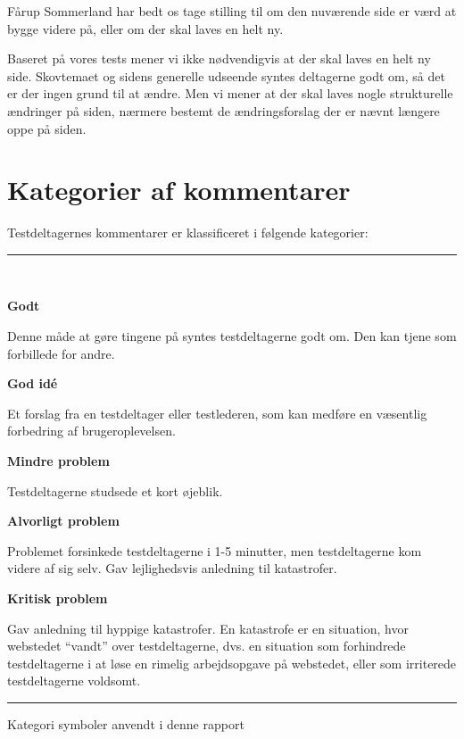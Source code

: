 \documentclass[10pt,a4paper]{article}      %
\newcommand\pic[1]{\texttt{[image: Pics/\#1]}}
\renewcommand\good{\pic{good}}
\renewcommand\goodidea{\pic{goodidea}}
\renewcommand\smallproblem{\pic{smallproblem}}
\renewcommand\seriousproblem{\pic{seriousproblem}}
\renewcommand\criticalproblem{\pic{criticalproblem}}
\begin{document}
\noindent Fårup Sommerland har bedt os tage stilling til om den nuværende side er værd at bygge videre på, eller om der skal laves en helt ny.

Baseret på vores tests mener vi ikke nødvendigvis at der skal laves en helt ny side. Skovtemaet og sidens generelle udseende syntes deltagerne godt om, så det er der ingen grund til at ændre. Men vi mener at der skal laves nogle strukturelle ændringer på siden, nærmere bestemt de ændringsforslag der er nævnt længere oppe på siden.

\clearpage

\tableofcontents
\clearpage


\section{Kategorier af kommentarer}
Testdeltagernes kommentarer er klassificeret i følgende kategorier:


\begin{table}[!ht]
\centering
\rule{\linewidth}{\heavyrulewidth}\\[6mm]
\begin{kommentarer}

\item[\good] \textbf{Godt}

Denne måde at gøre tingene på syntes testdeltagerne godt om. Den kan tjene som
forbillede for andre.

\item[\goodidea] \textbf{God idé}

Et forslag fra en testdeltager eller testlederen, som kan medføre en væsentlig
forbedring af brugeroplevelsen.

\item[\smallproblem] \textbf{Mindre problem}

Testdeltagerne studsede et kort øjeblik.

\item[\seriousproblem] \textbf{Alvorligt problem}

Problemet forsinkede testdeltagerne i 1-5 minutter, men testdeltagerne kom
videre af sig selv.  Gav lejlighedsvis anledning til katastrofer.

\item[\criticalproblem] \textbf{Kritisk problem}

Gav anledning til hyppige katastrofer. En katastrofe er en situation, hvor
webstedet ``vandt'' over testdeltagerne, dvs. en situation som forhindrede
testdeltagerne i at løse en rimelig arbejdsopgave på webstedet, eller som
irriterede testdeltagerne voldsomt.

\end{kommentarer}
\rule{\linewidth}{\heavyrulewidth}
\caption{Kategori symboler anvendt i denne rapport}
\label{tab:gt}
\end{table}
\end{document}
